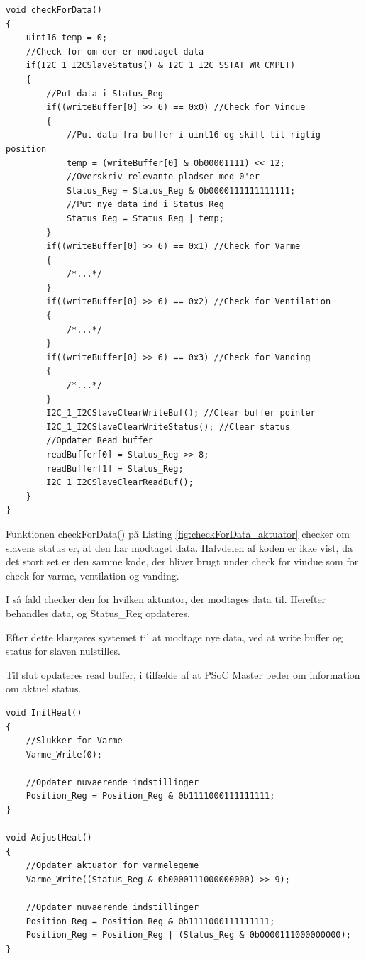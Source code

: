 \clearpage

\begin{lstlisting}[caption=Udsnit af checkForData.c for PSoC4 i Aktuator, label=fig:checkForData_aktuator]
void checkForData()
{
    uint16 temp = 0;
    //Check for om der er modtaget data
    if(I2C_1_I2CSlaveStatus() & I2C_1_I2C_SSTAT_WR_CMPLT)
    {
        //Put data i Status_Reg            
        if((writeBuffer[0] >> 6) == 0x0) //Check for Vindue
        {
            //Put data fra buffer i uint16 og skift til rigtig position
            temp = (writeBuffer[0] & 0b00001111) << 12; 
            //Overskriv relevante pladser med 0'er
            Status_Reg = Status_Reg & 0b0000111111111111;
            //Put nye data ind i Status_Reg
            Status_Reg = Status_Reg | temp;                
        }           
        if((writeBuffer[0] >> 6) == 0x1) //Check for Varme
        {
            /*...*/               
        }           
        if((writeBuffer[0] >> 6) == 0x2) //Check for Ventilation
        {
            /*...*/             
        }            
        if((writeBuffer[0] >> 6) == 0x3) //Check for Vanding
        {
            /*...*/           
        }                    
        I2C_1_I2CSlaveClearWriteBuf(); //Clear buffer pointer
        I2C_1_I2CSlaveClearWriteStatus(); //Clear status                       
        //Opdater Read buffer
        readBuffer[0] = Status_Reg >> 8;
        readBuffer[1] = Status_Reg;     
        I2C_1_I2CSlaveClearReadBuf();
    }
}
\end{lstlisting}

Funktionen checkForData() på Listing \ref{fig:checkForData_aktuator} checker om slavens status er, at den har modtaget data. Halvdelen af koden er ikke vist, da det stort set er den samme kode, der bliver brugt under check for vindue som for check for varme, ventilation og vanding.

I så fald checker den for hvilken aktuator, der modtages data til.
Herefter behandles data, og Status\_Reg opdateres.

Efter dette klargøres systemet til at modtage nye data, ved at write buffer og status for slaven nulstilles.

Til slut opdateres read buffer, i tilfælde af at PSoC Master beder om information om aktuel status. 

\clearpage

\begin{lstlisting}[caption=Udsnit af heat.c for PSoC4 i Aktuator, label=fig:heat_aktuator]
void InitHeat()
{   
    //Slukker for Varme
    Varme_Write(0);
    
    //Opdater nuvaerende indstillinger
    Position_Reg = Position_Reg & 0b1111000111111111;
}

void AdjustHeat()
{
    //Opdater aktuator for varmelegeme
    Varme_Write((Status_Reg & 0b0000111000000000) >> 9);
    
    //Opdater nuvaerende indstillinger
    Position_Reg = Position_Reg & 0b1111000111111111;
    Position_Reg = Position_Reg | (Status_Reg & 0b0000111000000000);
}
\end{lstlisting}

